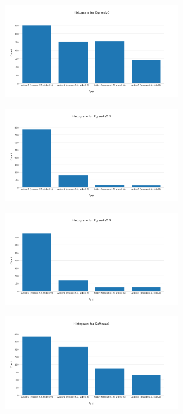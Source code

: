 \documentclass[11pt]{article}
\begin{document}
\begin{figure}[H]
   \centering
   \includegraphics[width=0.7\textwidth]{img/1-1/h2.png}
\end{figure}

\begin{figure}[H]
   \centering
   \includegraphics[width=0.7\textwidth]{img/1-1/h3.png}
\end{figure}

\begin{figure}[H]
   \centering
   \includegraphics[width=0.7\textwidth]{img/1-1/h4.png}
\end{figure}

\begin{figure}[H]
   \centering
   \includegraphics[width=0.7\textwidth]{img/1-1/h5.png}
\end{figure}
\end{document}
